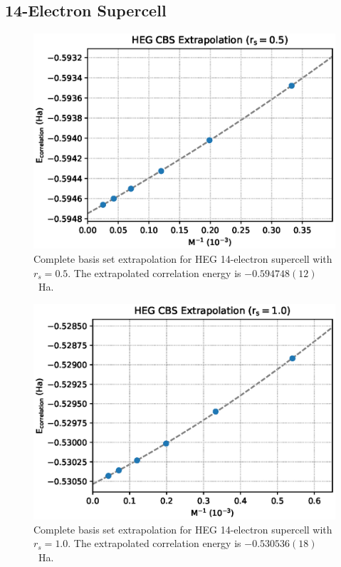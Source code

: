 \subsection{14-Electron Supercell}
\begin{figure}
  \begin{center}
  \includegraphics[width=\linewidth]{figs/cbs14e_05.eps}
  \end{center}
  \vspace{-0.2cm}
  \caption{Complete basis set extrapolation for HEG 14-electron supercell with $r_s=0.5$.
  The extrapolated correlation energy is $-0.594748(12)$~Ha.
  }
  \label{fig:cbs14e_05}
\end{figure}
\begin{figure}
  \begin{center}
  \includegraphics[width=\linewidth]{figs/cbs14e_10.eps}
  \end{center}
  \vspace{-0.2cm}
  \caption{Complete basis set extrapolation for HEG 14-electron supercell with $r_s=1.0$.
  The extrapolated correlation energy is $-0.530536(18)$~Ha.
  }
  \label{fig:cbs14e_10}
\end{figure}
